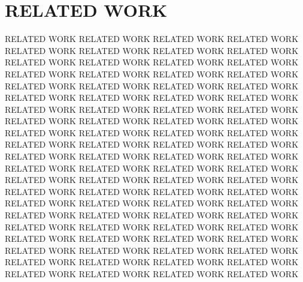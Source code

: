 \section{RELATED WORK}

RELATED WORK RELATED WORK RELATED WORK RELATED WORK RELATED WORK RELATED WORK RELATED WORK
RELATED WORK RELATED WORK RELATED WORK RELATED WORK RELATED WORK RELATED WORK RELATED WORK
RELATED WORK RELATED WORK RELATED WORK RELATED WORK RELATED WORK RELATED WORK RELATED WORK
RELATED WORK RELATED WORK RELATED WORK RELATED WORK RELATED WORK RELATED WORK RELATED WORK
RELATED WORK RELATED WORK RELATED WORK RELATED WORK RELATED WORK RELATED WORK RELATED WORK
RELATED WORK RELATED WORK RELATED WORK RELATED WORK RELATED WORK RELATED WORK RELATED WORK
RELATED WORK RELATED WORK RELATED WORK RELATED WORK RELATED WORK RELATED WORK RELATED WORK
RELATED WORK RELATED WORK RELATED WORK RELATED WORK RELATED WORK RELATED WORK RELATED WORK
RELATED WORK RELATED WORK RELATED WORK RELATED WORK RELATED WORK RELATED WORK RELATED WORK
RELATED WORK RELATED WORK RELATED WORK RELATED WORK RELATED WORK RELATED WORK RELATED WORK
RELATED WORK RELATED WORK RELATED WORK RELATED WORK RELATED WORK RELATED WORK RELATED WORK
RELATED WORK RELATED WORK RELATED WORK RELATED WORK RELATED WORK RELATED WORK RELATED WORK
